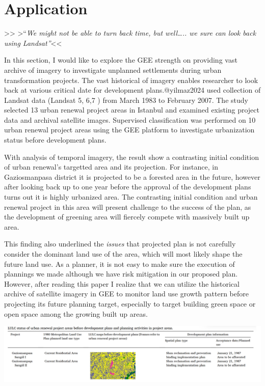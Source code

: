\documentclass[
  letterpaper,
  DIV=11,
  numbers=noendperiod]{scrreprt}
\begin{document}
\hypertarget{application-3}{%
\section{Application}\label{application-3}}

\textgreater\textgreater{} \textgreater``\emph{We might not be able to
turn back time, but well\ldots.. we sure can look back using
Landsat''}\textless\textless{}

In this section, I would like to explore the GEE strength on providing
vast archive of imagery to investigate unplanned settlements during
urban transformation projects. The vast historical of imagery enables
researcher to look back at various critical date for development
plans.@yilmaz2024 used collection of Landsat data (Landsat 5, 6,7 ) from
March 1983 to February 2007. The study selected 13 urban renewal project
areas in Istanbul and examined existing project data and archival
satellite images. Supervised classification was performed on 10 urban
renewal project areas using the GEE platform to investigate urbanization
status before development plans.

With analysis of temporal imagery, the result show a contrasting initial
condition of urban renewal's targetted area and its projection. For
instance, in Gaziosmanpasa district it is projected to be a forested
area in the future, however after looking back up to one year before the
approval of the development plans turns out it is highly urbanized area.
The contrasting initial condition and urban renewal project in this area
will present challenge to the success of the plan, as the development of
greening area will fiercely compete with massively built up area.

This finding also underlined the \emph{issues} that projected plan is
not carefully consider the dominant land use of the area, which will
most likely shape the future land use. As a planner, it is not easy to
make sure the execution of plannings we made although we have risk
mitigation in our proposed plan. However, after reading this paper I
realize that we can utilize the historical archive of satellite imagery
in GEE to monitor land use growth pattern before projecting its future
planning target, especially to target building green space or open space
among the growing built up areas.

\includegraphics[width=7.58333in,height=\textheight]{images/clipboard-3598015637.png}
\end{document}
